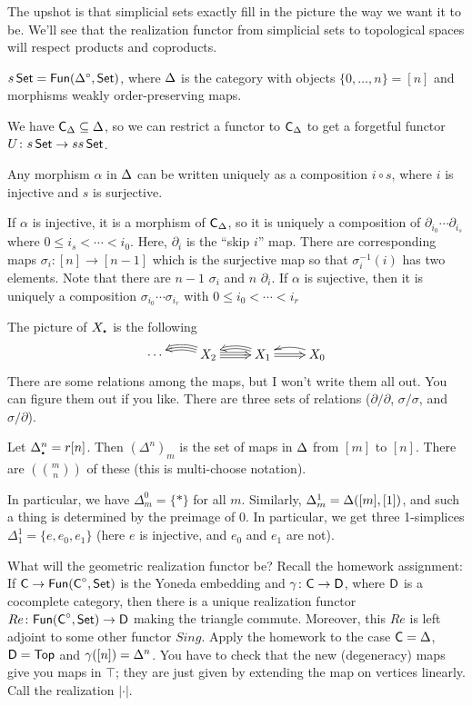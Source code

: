 The upshot is that simplicial sets exactly fill in the picture the way we want it to be. We'll see that the realization functor from simplicial sets to topological spaces will respect products and coproducts.
\begin{definition}
 $s\operatorname{\sf Set}=\text{\sf Fun}(\Delta^\circ,\operatorname{\sf Set})$, where $\Delta$ is the category with objects $\{0,\dots, n\}=[n]$ and morphisms weakly order-preserving maps.
\end{definition}
We have $\text{\sf C}_\Delta\subseteq \Delta$, so we can restrict a functor to $\text{\sf C}_\Delta$ to get a forgetful functor $U\colon s\operatorname{\sf Set}\to ss\operatorname{\sf Set}$.
\begin{lemma}
 Any morphism $\alpha$ in $\Delta$ can be written uniquely as a composition $i\circ s$, where $i$ is injective and $s$ is surjective.
\end{lemma}
If $\alpha$ is injective, it is a morphism of $\text{\sf C}_\Delta$, so it is uniquely a composition of $\partial_{i_0}\cdots\partial_{i_s}$ where $0\le i_s< \cdots < i_0$. Here, $\partial_i$ is the ``skip $i$'' map. There are corresponding maps $\sigma_i\colon [n]\to [n-1]$ which is the surjective map so that $\sigma_i^{-1}(i)$ has two elements. Note that there are $n-1$ $\sigma_i$ and $n$ $\partial_i$. If $\alpha$ is sujective, then it is uniquely a composition $\sigma_{i_0}\cdots \sigma_{i_r}$ with $0\le i_0< \cdots < i_r$

The picture of $X_\udot$ is the following
\[\xymatrix{
 \cdots & X_2 \ar@3{->}@/_/[l] \ar@3{->}[r] & X_1 \ar@2{->}[r] \ar@2{->}@/_/[l] & X_0 \ar@/_/[l]
}\]
There are some relations among the maps, but I won't write them all out. You can figure them out if you like. There are three sets of relations ($\partial/\partial$, $\sigma/\sigma$, and $\sigma/\partial$).
\begin{example}
 Let $\Delta_\udot^n=r[n]$. Then $(\Delta^n)_m$ is the set of maps in $\Delta$ from $[m]$ to $[n]$. There are $\left(\!\binom mn \! \right)$ of these (this is multi-choose notation). 
 
 In particular, we have $\Delta^0_m = \{*\}$ for all $m$. Similarly, $\Delta^1_m = \Delta([m],[1])$, and such a thing is determined by the preimage of $0$. In particular, we get three 1-simplices $\Delta^1_1=\{e,e_0,e_1\}$ (here $e$ is injective, and $e_0$ and $e_1$ are not).
\end{example}

What will the geometric realization functor be? Recall the homework assignment: If $\text{\sf C}\to \text{\sf Fun}(\text{\sf C}^\circ, \operatorname{\sf Set})$ is the Yoneda embedding and $\gamma\colon \text{\sf C}\to \text{\sf D}$, where $\text{\sf D}$ is a cocomplete category, then there is a unique realization functor $Re\colon \text{\sf Fun}(\text{\sf C}^\circ,\operatorname{\sf Set})\to \text{\sf D}$ making the triangle commute. Moreover, this $Re$ is left adjoint to some other functor $Sing$. Apply the homework to the case $\text{\sf C}=\Delta$, $\text{\sf D}=\text{\sf Top}$ and $\gamma([n])=\Delta^n$. You have to check that the new (degeneracy) maps give you maps in $\top$; they are just given by extending the map on vertices linearly. Call the realization $|\cdot|$.

